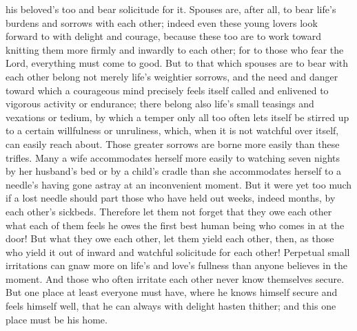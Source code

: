 \documentclass[12pt,a4paper]{book}
\begin{document}
his beloved's too and bear solicitude for it. Spouses are, after all, to
bear life's burdens and sorrows with each other; indeed even these young
lovers look forward to with delight and courage, because these too are to
work toward knitting them more firmly and inwardly to each other; for to
those who fear the Lord, everything must come to good. But to that which
spouses are to bear with each other belong not merely life's weightier
sorrows, and the need and danger toward which a courageous mind precisely
feels itself called and enlivened to vigorous activity or endurance; there
belong also life's small teasings and vexations or tedium, by which a
temper only all too often lets itself be stirred up to a certain
willfulness or unruliness, which, when it is not watchful over itself, can
easily reach about. Those greater sorrows are borne more easily than these
trifles. Many a wife accommodates herself more easily to watching seven
nights by her husband's bed or by a child's cradle than she accommodates
herself to a needle's having gone astray at an inconvenient moment. But it
were yet too much if a lost needle should part those who have held out
weeks, indeed months, by each other's sickbeds. Therefore let them not
forget that they owe each other what each of them feels he owes the first
best human being who comes in at the door! But what they owe each other,
let them yield each other, then, as those who yield it out of inward and
watchful solicitude for each other! Perpetual small irritations can gnaw
more on life's and love's fullness than anyone believes in the moment. And
those who often irritate each other never know themselves secure. But one
place at least everyone must have, where he knows himself secure and feels
himself well, that he can always with delight hasten thither; and this one
place must be his home.
\end{document}
